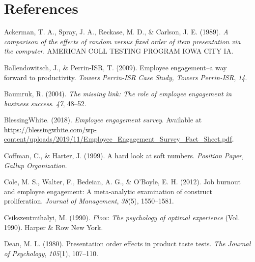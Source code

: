 \documentclass[
  man]{apa6}
\newlength{\cslhangindent}
\newlength{\cslentryspacingunit} %
\newenvironment{CSLReferences}[2] %
 {%
  \setlength{\parindent}{0pt}
  \ifodd #1
  \let\oldpar\par
  \def\par{\hangindent=\cslhangindent\oldpar}
  \fi
  \setlength{\parskip}{#2\cslentryspacingunit}
 }%
 {}
\begin{document}
\newpage

\hypertarget{references}{%
\section{References}\label{references}}

\begingroup
\setlength{\parindent}{-0.5in}
\setlength{\leftskip}{0.5in}

\hypertarget{refs}{}
\begin{CSLReferences}{1}{0}
\leavevmode{}%
Ackerman, T. A., Spray, J. A., Reckase, M. D., \& Carlson, J. E. (1989). \emph{A comparison of the effects of random versus fixed order of item presentation via the computer}. AMERICAN COLL TESTING PROGRAM IOWA CITY IA.

\leavevmode{}%
Ballendowitsch, J., \& Perrin-ISR, T. (2009). Employee engagement--a way forward to productivity. \emph{Towers Perrin-ISR Case Study, Towers Perrin-ISR}, \emph{14}.

\leavevmode{}%
Baumruk, R. (2004). \emph{The missing link: The role of employee engagement in business success}. \emph{47}, 48--52.

\leavevmode{}%
BlessingWhite. (2018). \emph{Employee engagement survey}. Available at \url{https://blessingwhite.com/wp-content/uploads/2019/11/Employee_Engagement_Survey_Fact_Sheet.pdf}.

\leavevmode{}%
Coffman, C., \& Harter, J. (1999). A hard look at soft numbers. \emph{Position Paper, Gallup Organization}.

\leavevmode{}%
Cole, M. S., Walter, F., Bedeian, A. G., \& O'Boyle, E. H. (2012). Job burnout and employee engagement: A meta-analytic examination of construct proliferation. \emph{Journal of Management}, \emph{38}(5), 1550--1581.

\leavevmode{}%
Csikszentmihalyi, M. (1990). \emph{Flow: The psychology of optimal experience} (Vol. 1990). Harper \& Row New York.

\leavevmode{}%
Dean, M. L. (1980). Presentation order effects in product taste tests. \emph{The Journal of Psychology}, \emph{105}(1), 107--110.


\end{CSLReferences}
\end{document}
